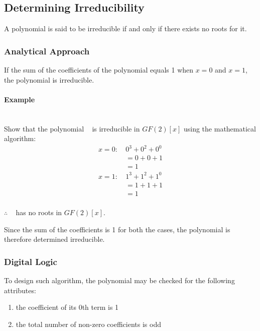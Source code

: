 \subsection{Determining Irreducibility} A polynomial is said to be
irreducible if and only if there exists no roots for it.

    \subsubsection{Analytical Approach} If the sum of the
    coefficients of the polynomial equals 1 when $x=0$ and $x=1$, the
    polynomial is irreducible.

    \paragraph{Example} \leavevmode \\ Show that the polynomial
    \examplepoly~ is irreducible in $GF(2)[x]$ using the mathematical
    algorithm:
        \begin{equation*}
            \begin{split}
                x=0 : \ &  0^{3} + 0^{2} + 0^{0} \\
                & = 0 + 0 + 1 \\
                & = 1 \\
                x=1 : \ &  1^{3} + 1^{2} + 1^{0} \\
                & = 1 + 1 + 1 \\
                & = 1 \\
            \end{split}
        \end{equation*}

        \centerline{$\therefore$ \examplepoly~ has no roots in
        $GF(2)[x]$.}

        Since the sum of the coefficients is 1 for both the cases, the
        polynomial is therefore determined irreducible.

    \subsubsection{Digital Logic} To design such algorithm, the
    polynomial may be checked for the following attributes:
    \begin{enumerate}
        \item the coefficient of its 0th term is 1
        \item the total number of non-zero coefficients is odd
    \end{enumerate}

